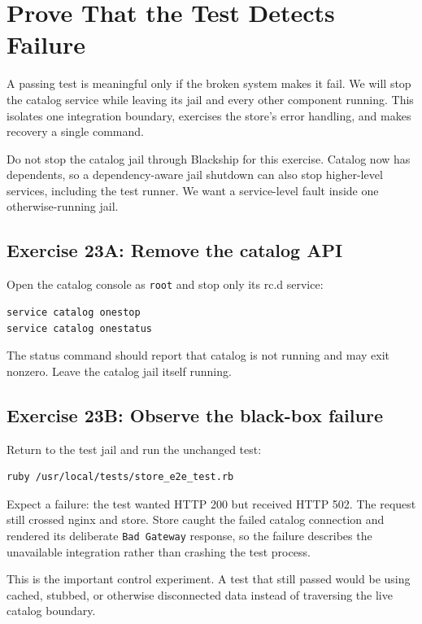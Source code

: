 \chapter{Prove That the Test Detects Failure}

A passing test is meaningful only if the broken system makes it fail. We will
stop the catalog service while leaving its jail and every other component
running. This isolates one integration boundary, exercises the store's error
handling, and makes recovery a single command.

Do not stop the catalog jail through Blackship for this exercise. Catalog now
has dependents, so a dependency-aware jail shutdown can also stop higher-level
services, including the test runner. We want a service-level fault inside one
otherwise-running jail.

\section{Exercise 23A: Remove the catalog API}

Open the catalog console as \texttt{root} and stop only its rc.d service:

\begin{lstlisting}[language=sh]
service catalog onestop
service catalog onestatus
\end{lstlisting}

The status command should report that catalog is not running and may exit
nonzero. Leave the catalog jail itself running.

\section{Exercise 23B: Observe the black-box failure}

Return to the test jail and run the unchanged test:

\begin{lstlisting}[language=sh]
ruby /usr/local/tests/store_e2e_test.rb
\end{lstlisting}

Expect a failure: the test wanted HTTP 200 but received HTTP 502. The request
still crossed nginx and store. Store caught the failed catalog connection and
rendered its deliberate \texttt{Bad Gateway} response, so the failure describes
the unavailable integration rather than crashing the test process.

This is the important control experiment. A test that still passed would be
using cached, stubbed, or otherwise disconnected data instead of traversing the
live catalog boundary.

